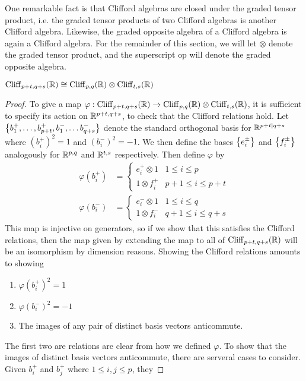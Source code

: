 One remarkable fact is that Clifford algebras are closed under the graded
tensor product, i.e. the graded tensor products of two Clifford algebras is
another Clifford algebra. Likewise, the graded opposite algebra of a Clifford
algebra is again a Clifford algebra. For the remainder of this section,
we will let $\otimes$ denote the graded tensor product, and the superscript
$\text{op}$ will denote the graded opposite algebra.
%
\begin{thm}
$\operatorname{Cliff}_{p+t,q+s}(\mathbb{R}) \cong \operatorname{Cliff}_{p,q}(\mathbb{R}) \otimes \operatorname{Cliff}_{t,s}(\mathbb{R})$
\end{thm}
%
\begin{proof}
To give a map $\varphi : \operatorname{Cliff}_{p+t,q+s}(\mathbb{R}) \to \operatorname{Cliff}_{p,q}(\mathbb{R}) \otimes
\operatorname{Cliff}_{t,s}(\mathbb{R})$, it is sufficient to specify its action on $\mathbb{R}^{p+t,q+s}$, to
check that the Clifford relations hold. Let
$\left\lbrace b_1^+,\ldots, b_{p+t}^+, b_1^-, \ldots b_{q+s}^- \right\rbrace$ denote the standard
orthogonal basis for $\mathbb{R}^{p+t|q+s}$ where $(b_i^+)^2 = 1$ and $(b_i^-)^2 = -1$.
We then define the bases $\left\lbrace e_i^\pm \right\rbrace$ and $\left\lbrace f_i^\pm \right\rbrace$ analogously for
$\mathbb{R}^{p,q}$ and $\mathbb{R}^{t,s}$ respectively. Then define $\varphi$ by
%
\begin{align*}
\varphi(b_i^+) &= \begin{cases}
e_i^+ \otimes 1 & 1 \leq i \leq p \\
1 \otimes f_i^+ & p+1 \leq i \leq p+t
\end{cases} \\
\varphi(b_i^-) &= \begin{cases}
e_i^- \otimes 1 & 1 \leq i \leq q \\
1 \otimes f_i^- & q+1 \leq i \leq q+s
\end{cases}
\end{align*}
%
This map is injective on generators, so if we show that this satisfies the
Clifford relations, then the map given by extending the map to all of
$\operatorname{Cliff}_{p+t,q+s}(\mathbb{R})$ will be an isomorphism by dimension reasons. Showing
the Clifford relations amounts to showing
%
\begin{enumerate}
  \item $\varphi(b_i^+)^2 = 1$
  \item $\varphi(b_i^-)^2 = -1$
  \item The images of any pair of distinct basis vectors anticommute.
\end{enumerate}
%
The first two are relations are clear from how we defined $\varphi$. To show
that the images of distinct basis vectors anticommute, there are serveral
cases to consider. Given $b_i^+$ and $b_j^+$ where $1 \leq i,j \leq p$, they

\end{proof}
